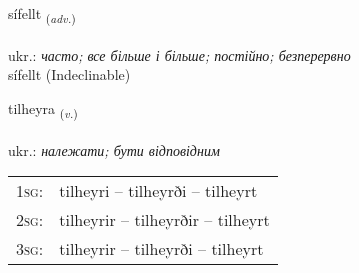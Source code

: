\documentclass[frontgrid, backgrid]{flacards}\usepackage[]{graphicx}\usepackage[]{xcolor}
\begin{document}

\renewcommand{\flhead}{\vskip5pt \fboxsep=0pt {\small\bfseries\footnotesize Atviksorð | прислівник}}
\renewcommand{\fcfoot}{\vskip5pt \fboxsep=0pt \hspace{2pt}{\small\bfseries\footnotesize 2K}}

\renewcommand{\blhead}{\vskip5pt {\small\bfseries\footnotesize Atviksorð | прислівник }}
\renewcommand{\bcfoot}{\vskip5pt \hspace{2pt}{\small\bfseries\footnotesize 2K}}


{sífellt \small{\textsubscript{(\textit{adv.})}} \\[1ex]
\textphonetic{[siːfɛl̥t]} \\
ukr.: \emph{часто; все більше і більше; постійно; безперервно} \\  [2ex]
sífellt (Indeclinable)}

\renewcommand{\flhead}{\vskip5pt \fboxsep=0pt {\small\bfseries\footnotesize Sagnorð | дієслово}}
\renewcommand{\fcfoot}{\vskip5pt \fboxsep=0pt \hspace{2pt}{\small\bfseries\footnotesize 2K}}

\renewcommand{\blhead}{\vskip5pt {\small\bfseries\footnotesize Sagnorð | дієслово }}
\renewcommand{\bcfoot}{\vskip5pt \hspace{2pt}{\small\bfseries\footnotesize 2K}}


{tilheyra \small{\textsubscript{(\textit{v.})}} \\[1ex] %
\textphonetic{[tʰɪlheira]} \\
ukr.: \emph{належати; бути відповідним} \\  [2ex]
\renewcommand*{\arraystretch}{0.8}
\begin{tabular}{p{1cm}l}
\textsc{1sg}: & tilheyri -- tilheyrði -- tilheyrt \\ 
\textsc{2sg}: & tilheyrir -- tilheyrðir -- tilheyrt \\ 
\textsc{3sg}: & tilheyrir -- tilheyrði -- tilheyrt \\ 
\end{tabular}
}
\end{document}
